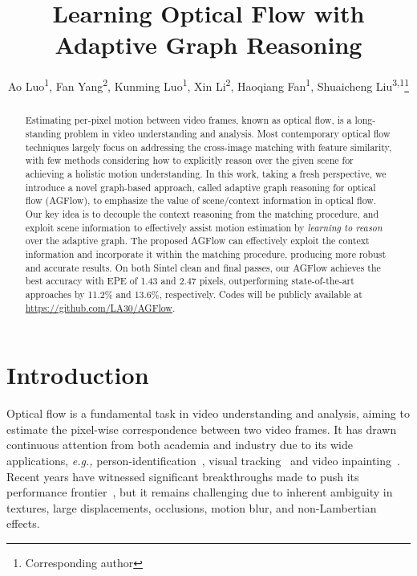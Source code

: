 \documentclass[letterpaper]{article} %
\title{Learning Optical Flow with Adaptive Graph Reasoning}
\author{
	Ao Luo\textsuperscript{\rm 1}, Fan Yang\textsuperscript{\rm 2}, Kunming Luo\textsuperscript{\rm 1}, Xin Li\textsuperscript{\rm 2}, Haoqiang Fan\textsuperscript{\rm 1}, Shuaicheng Liu\textsuperscript{\rm 3,1}\thanks{Corresponding author}\\
}
\begin{document}
\maketitle


\begin{abstract}

Estimating per-pixel motion between video frames, known as optical flow, is a long-standing problem in video understanding and analysis. Most contemporary optical flow techniques largely focus on addressing the cross-image matching with feature similarity, with few methods considering how to explicitly reason over the given scene for achieving a holistic motion understanding. In this work, taking a fresh perspective, we introduce a novel graph-based approach, called adaptive graph reasoning for optical flow (AGFlow), to emphasize the value of scene/context information in optical flow. Our key idea is to decouple the context reasoning from the matching procedure, and exploit scene information to effectively assist motion estimation by \emph{learning to reason} over the adaptive graph. The proposed AGFlow can effectively exploit the context information and incorporate it within the matching procedure, producing more robust and accurate results. On both Sintel clean and final passes, our AGFlow achieves the best accuracy with EPE of 1.43 and 2.47 pixels, outperforming state-of-the-art approaches by 11.2\% and 13.6\%, respectively. Codes will be publicly available at \url{https://github.com/LA30/AGFlow}.

\end{abstract}


\section{Introduction}

Optical flow is a fundamental task in video understanding and analysis, aiming to estimate the pixel-wise correspondence between two video frames. It has drawn continuous attention from both academia and industry due to its wide applications, \emph{e.g.,}  person-identification~\cite{chen2020frame}, visual tracking~\cite{vihlman2020optical} and video inpainting~\cite{Xu_2019_CVPR}. Recent years have witnessed significant breakthroughs made to push its performance frontier~\cite{Dosovitskiy2015FlowNetLO, Ilg2017FlowNet2E,Teed2020RAFTRA, Jiang2021LearningOF}, but it remains challenging due to inherent ambiguity in textures, large displacements, occlusions, motion blur, and non-Lambertian effects.
\end{document}
